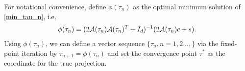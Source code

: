 \documentclass{article}
\newtheorem{theorem}{Theorem}[section]
\theoremstyle{remark}
\begin{document}
For notational convenience, define $\phi(\tau_{n})$ as the optimal minimum solution of \eqref{min_tau_n}, i.e,
\[
\phi(\tau_{n})=( 2{\cal A}(\tau_{n}){\cal A}(\tau_{n})^T+ I_d)^{-1} (2{\cal A}(\tau_{n})c+ s).
\]
Using $\phi(\tau_n)$, we can define a vector sequence $\{\tau_n, n = 1,2...,\}$ via the fixed-point iteration by
$\tau_{n+1} = \phi(\tau_n)$
and set the convergence point $\tau^*$ as the coordinate for the true projection.
\end{document}
